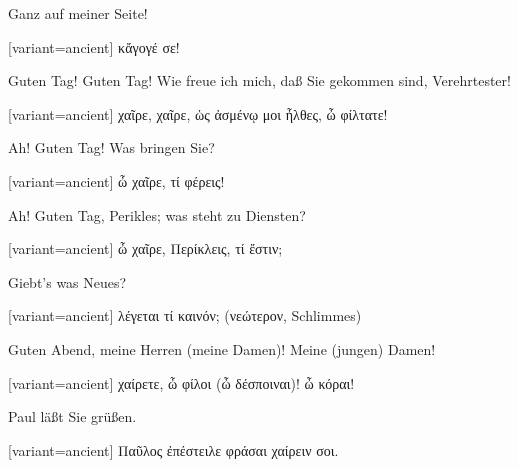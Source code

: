 Ganz auf meiner Seite!

\switchcolumn

\begin{greek}[variant=ancient]%
κἄγογέ σε!

\end{greek}%
\switchcolumn*

Guten Tag! Guten Tag! Wie freue ich mich, daß Sie gekommen sind, Verehrtester!

\switchcolumn

\begin{greek}[variant=ancient]%
χαῖρε, χαῖρε, ὡς ἀσμένῳ μοι ἦλθες, ὦ φίλτατε!

\end{greek}%
\switchcolumn*

Ah! Guten Tag! Was bringen Sie?

\switchcolumn

\begin{greek}[variant=ancient]%
ὦ χαῖρε, τί φέρεις!

\end{greek}%
\switchcolumn*

Ah! Guten Tag, Perikles; was steht zu Diensten?

\switchcolumn

\begin{greek}[variant=ancient]%
ὦ χαῖρε, Περίκλεις, τί ἔστιν;

\end{greek}%
\switchcolumn*

Giebt's was Neues?

\switchcolumn

\begin{greek}[variant=ancient]%
λέγεται τί καινόν; (νεώτερον, \textgerman[spelling=old,babelshorthands=true]{Schlimmes})

\end{greek}%
\switchcolumn*

Guten Abend, meine Herren (meine Damen)! Meine (jungen) Damen!

\switchcolumn

\begin{greek}[variant=ancient]%
χαίρετε, ὦ φίλοι (ὦ δέσποιναι)! ὦ κόραι!

\end{greek}%
\switchcolumn*

Paul läßt Sie grüßen.

\switchcolumn

\begin{greek}[variant=ancient]%
Παῦλος ἐπέστειλε φράσαι χαίρειν σοι.

\end{greek}%
\switchcolumn*

